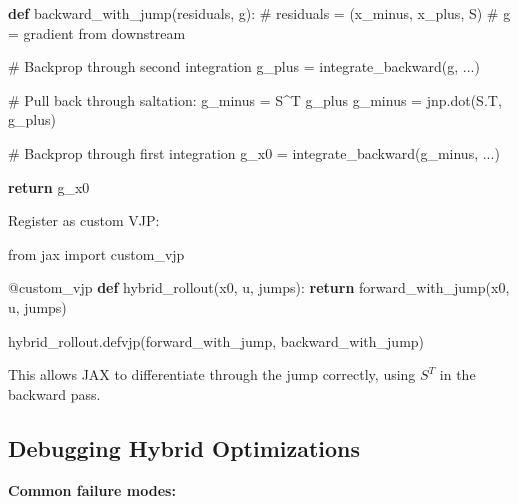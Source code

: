 \documentclass[
  letterpaper,
  DIV=11,
  numbers=noendperiod]{scrartcl}
\newenvironment{Shaded}{\begin{snugshade}}{\end{snugshade}}
\newcommand{\AttributeTok}[1]{\textcolor[rgb]{0.40,0.45,0.13}{#1}}
\newcommand{\CommentTok}[1]{\textcolor[rgb]{0.37,0.37,0.37}{#1}}
\newcommand{\ControlFlowTok}[1]{\textcolor[rgb]{0.00,0.23,0.31}{\textbf{#1}}}
\newcommand{\ImportTok}[1]{\textcolor[rgb]{0.00,0.46,0.62}{#1}}
\newcommand{\KeywordTok}[1]{\textcolor[rgb]{0.00,0.23,0.31}{\textbf{#1}}}
\newcommand{\NormalTok}[1]{\textcolor[rgb]{0.00,0.23,0.31}{#1}}
\newcommand{\OperatorTok}[1]{\textcolor[rgb]{0.37,0.37,0.37}{#1}}
\begin{document}
\begin{Shaded}
\begin{Highlighting}[]
\KeywordTok{def}\NormalTok{ backward\_with\_jump(residuals, g):}
    \CommentTok{\# residuals = (x\_minus, x\_plus, S)}
    \CommentTok{\# g = gradient from downstream}

    \CommentTok{\# Backprop through second integration}
\NormalTok{    g\_plus }\OperatorTok{=}\NormalTok{ integrate\_backward(g, ...)}

    \CommentTok{\# Pull back through saltation: g\_minus = S\^{}T g\_plus}
\NormalTok{    g\_minus }\OperatorTok{=}\NormalTok{ jnp.dot(S.T, g\_plus)}

    \CommentTok{\# Backprop through first integration}
\NormalTok{    g\_x0 }\OperatorTok{=}\NormalTok{ integrate\_backward(g\_minus, ...)}

    \ControlFlowTok{return}\NormalTok{ g\_x0}
\end{Highlighting}
\end{Shaded}

Register as custom VJP:

\begin{Shaded}
\begin{Highlighting}[]
\ImportTok{from}\NormalTok{ jax }\ImportTok{import}\NormalTok{ custom\_vjp}

\AttributeTok{@custom\_vjp}
\KeywordTok{def}\NormalTok{ hybrid\_rollout(x0, u, jumps):}
    \ControlFlowTok{return}\NormalTok{ forward\_with\_jump(x0, u, jumps)}

\NormalTok{hybrid\_rollout.defvjp(forward\_with\_jump, backward\_with\_jump)}
\end{Highlighting}
\end{Shaded}

This allows JAX to differentiate through the jump correctly, using
\(S^T\) in the backward pass.

\subsection{Debugging Hybrid
Optimizations}\label{debugging-hybrid-optimizations}

\textbf{Common failure modes:}
\end{document}
